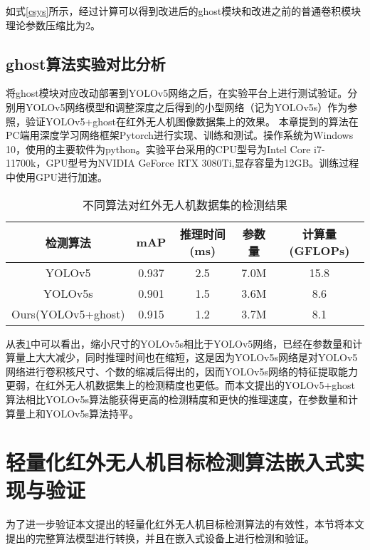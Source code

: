 如式\ref{csys}所示，经过计算可以得到改进后的ghost模块和改进之前的普通卷积模块理论参数压缩比为2。

\subsection{ghost算法实验对比分析}
将ghost模块对应改动部署到YOLOv5网络之后，在实验平台上进行测试验证。分别用YOLOv5网络模型和调整深度之后得到的小型网络（记为YOLOv5s）作为参照，验证YOLOv5+ghost在红外无人机图像数据集上的效果。
本章提到的算法在PC端用深度学习网络框架Pytorch进行实现、训练和测试。操作系统为Windows 10，使用的主要软件为python。实验平台采用的CPU型号为Intel Core i7-11700k，GPU型号为NVIDIA GeForce RTX 3080Ti,显存容量为12GB。训练过程中使用GPU进行加速。

\begin{table}[htbp]
    \caption{不同算法对红外无人机数据集的检测结果}
    \vspace{0.5em}\centering\wuhao
    \begin{tabular}{ccccc}
    \toprule
    检测算法 & mAP & 推理时间(ms) & 参数量 & 计算量(GFLOPs)\\
    \midrule
    YOLOv5 & 0.937 & 2.5 & 7.0M & 15.8\\
    YOLOv5s & 0.901 & 1.5 & 3.6M & 8.6\\
    Ours(YOLOv5+ghost)& 0.915 & 1.2 & 3.7M & 8.1\\
    \bottomrule
    \end{tabular}
    \label{t22}
\end{table}

从表\ref{t22}中可以看出，缩小尺寸的YOLOv5s相比于YOLOv5网络，已经在参数量和计算量上大大减少，同时推理时间也在缩短，这是因为YOLOv5s网络是对YOLOv5网络进行卷积核尺寸、个数的缩减后得出的，因而YOLOv5s网络的特征提取能力更弱，在红外无人机数据集上的检测精度也更低。而本文提出的YOLOv5+ghost算法相比YOLOv5s算法能获得更高的检测精度和更快的推理速度，在参数量和计算量上和YOLOv5s算法持平。

\section{轻量化红外无人机目标检测算法嵌入式实现与验证}
为了进一步验证本文提出的轻量化红外无人机目标检测算法的有效性，本节将本文提出的完整算法模型进行转换，并且在嵌入式设备上进行检测和验证。

